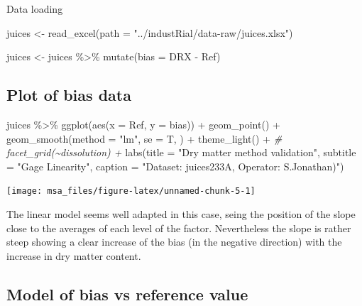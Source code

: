 \documentclass[
]{book}
\newenvironment{Shaded}{\begin{snugshade}}{\end{snugshade}}
\newcommand{\AttributeTok}[1]{\textcolor[rgb]{0.77,0.63,0.00}{#1}}
\newcommand{\CommentTok}[1]{\textcolor[rgb]{0.56,0.35,0.01}{\textit{#1}}}
\newcommand{\FunctionTok}[1]{\textcolor[rgb]{0.00,0.00,0.00}{#1}}
\newcommand{\NormalTok}[1]{#1}
\newcommand{\OtherTok}[1]{\textcolor[rgb]{0.56,0.35,0.01}{#1}}
\newcommand{\SpecialCharTok}[1]{\textcolor[rgb]{0.00,0.00,0.00}{#1}}
\newcommand{\StringTok}[1]{\textcolor[rgb]{0.31,0.60,0.02}{#1}}
\begin{document}
Data loading

\begin{Shaded}
\begin{Highlighting}[]
\NormalTok{juices }\OtherTok{\textless{}{-}} \FunctionTok{read\_excel}\NormalTok{(}\AttributeTok{path =} \StringTok{"../industRial/data{-}raw/juices.xlsx"}\NormalTok{) }

\NormalTok{juices }\OtherTok{\textless{}{-}}\NormalTok{ juices }\SpecialCharTok{\%\textgreater{}\%}
  \FunctionTok{mutate}\NormalTok{(}\AttributeTok{bias =}\NormalTok{ DRX }\SpecialCharTok{{-}}\NormalTok{ Ref)}
\end{Highlighting}
\end{Shaded}

\hypertarget{plot-of-bias-data}{%
\subsection{Plot of bias data}\label{plot-of-bias-data}}

\begin{Shaded}
\begin{Highlighting}[]
\NormalTok{juices }\SpecialCharTok{\%\textgreater{}\%}
  \FunctionTok{ggplot}\NormalTok{(}\FunctionTok{aes}\NormalTok{(}\AttributeTok{x =}\NormalTok{ Ref, }\AttributeTok{y =}\NormalTok{ bias)) }\SpecialCharTok{+}
  \FunctionTok{geom\_point}\NormalTok{() }\SpecialCharTok{+}
  \FunctionTok{geom\_smooth}\NormalTok{(}\AttributeTok{method =} \StringTok{"lm"}\NormalTok{, }\AttributeTok{se =}\NormalTok{ T, ) }\SpecialCharTok{+}
  \FunctionTok{theme\_light}\NormalTok{() }\SpecialCharTok{+}
  \CommentTok{\# facet\_grid(\textasciitilde{}dissolution) +}
  \FunctionTok{labs}\NormalTok{(}\AttributeTok{title =} \StringTok{"Dry matter method validation"}\NormalTok{,}
       \AttributeTok{subtitle =} \StringTok{"Gage Linearity"}\NormalTok{,}
       \AttributeTok{caption =} \StringTok{"Dataset: juices233A, Operator: S.Jonathan)"}\NormalTok{)}
\end{Highlighting}
\end{Shaded}

\texttt{[image: msa\_files/figure-latex/unnamed-chunk-5-1]}

The linear model seems well adapted in this case, seing the position of the slope close to the averages of each level of the factor. Nevertheless the slope is rather steep showing a clear increase of the bias (in the negative direction) with the increase in dry matter content.

\hypertarget{model-of-bias-vs-reference-value}{%
\subsection{Model of bias vs reference value}\label{model-of-bias-vs-reference-value}}
\end{document}
